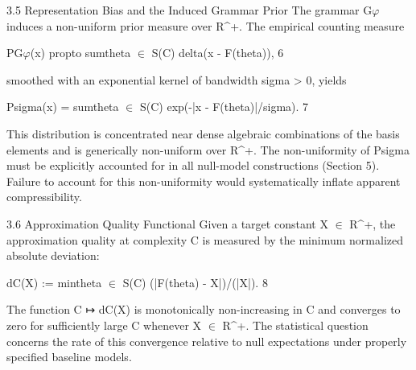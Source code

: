   3.5 Representation Bias and the Induced Grammar Prior
  The grammar G$\varphi$ induces a non-uniform prior measure over R^+. The empirical
  counting measure

  PG$\varphi$(x) propto sumtheta $\in$ S(C) delta(x - F(theta)), 6

  smoothed with an exponential kernel of bandwidth sigma > 0, yields

  Psigma(x) = sumtheta $\in$ S(C) exp(-|x - F(theta)|/sigma). 7

  This distribution is concentrated near dense algebraic combinations of the basis
  elements and is generically non-uniform over R^+. The non-uniformity of Psigma must
  be explicitly accounted for in all null-model constructions (Section 5). Failure to
  account for this non-uniformity would systematically inflate apparent compressibility.

  3.6 Approximation Quality Functional
  Given a target constant X $\in$ R^+, the approximation quality at complexity C is
  measured by the minimum normalized absolute deviation:

  dC(X) := mintheta $\in$ S(C) (|F(theta) - X|)/(|X|). 8

  The function C ↦ dC(X) is monotonically non-increasing in C and converges to zero for
  sufficiently large C whenever X $\in$ R^+. The statistical question concerns the rate of
  this convergence relative to null expectations under properly specified baseline models.

